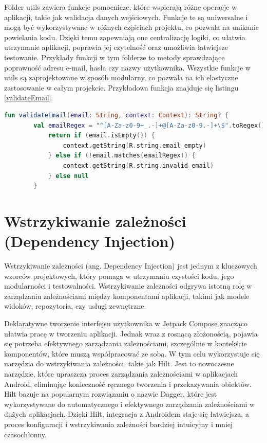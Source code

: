 \documentclass[12pt,twoside]{article}
\begin{document}
Folder utils zawiera funkcje pomocnicze, które wspierają różne operacje w aplikacji, takie jak walidacja danych 
wejściowych. Funkcje te są uniwersalne i mogą być wykorzystywane w różnych częściach projektu, co pozwala na unikanie 
powielania kodu. Dzięki temu zapewniają one centralizację logiki, co ułatwia utrzymanie aplikacji, poprawia jej 
czytelność oraz umożliwia łatwiejsze testowanie. Przykłady funkcji w tym folderze to metody sprawdzające poprawność 
adresu e-mail, hasła czy nazwy użytkownika. Wszystkie funkcje w utils są zaprojektowane w sposób modularny, co 
pozwala na ich elastyczne zastosowanie w całym projekcie. Przykładowa funkcja znajduje się listingu \ref{validateEmail}

\begin{lstlisting}[language=Kotlin,caption=kod funkcji validateEmail, label={validateEmail}]
	fun validateEmail(email: String, context: Context): String? {
    	val emailRegex = "^[A-Za-z0-9+_.-]+@[A-Za-z0-9.-]+\$".toRegex()
    		return if (email.isEmpty()) {
        		context.getString(R.string.email_empty)
    		} else if (!email.matches(emailRegex)) {
        		context.getString(R.string.invalid_email)
    		} else null
		}
\end{lstlisting}

\clearpage

\section{Wstrzykiwanie zależności (Dependency Injection)}

Wstrzykiwanie zależności (ang. Dependency Injection) jest jednym z kluczowych wzorców projektowych, który pomaga 
w utrzymaniu czystości kodu, jego modularności i testowalności. Wstrzykiwanie zależności odgrywa istotną rolę w 
zarządzaniu zależnościami między komponentami aplikacji, takimi jak modele widoków, repozytoria, czy usługi 
zewnętrzne.

Deklaratywne tworzenie interfejsu użytkownika w Jetpack Compose znacząco ułatwia pracę w tworzeniu aplikacji. Jednak
wraz z rosnącą złożonością, pojawia się potrzeba efektywnego zarządzania zależnościami, szczególnie w kontekście 
komponentów, które muszą współpracować ze sobą. W tym celu wykorzystuje się narzędzia do wstrzykiwania zależności, 
takie jak Hilt. Jest to nowoczesne narzędzie, które upraszcza proces zarządzania zależnościami w aplikacjach Android, 
eliminując konieczność ręcznego tworzenia i przekazywania obiektów. Hilt bazuje na popularnym rozwiązaniu o nazwie 
Dagger, które jest wykorzystywane do automatycznego i efektywnego zarządzania zależnościami w dużych aplikacjach. 
Dzięki Hilt, integracja z Androidem staje się łatwiejsza, a proces konfiguracji i wstrzykiwania zależności bardziej 
intuicyjny i mniej czasochłonny.
\end{document}
